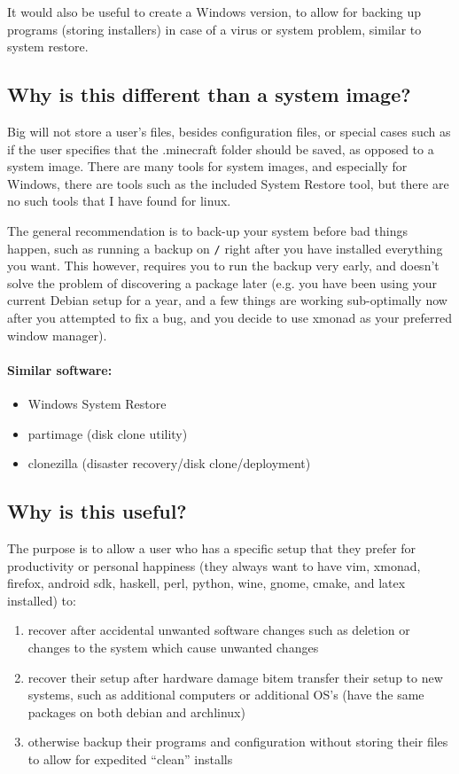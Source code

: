\documentclass[12pt]{article}
\begin{document}
        It would also be useful to create a Windows version, to allow for backing up programs (storing installers) in case of a virus or system problem, similar to system restore.

        \subsection{Why is this different than a system image?}
            Big will not store a user's files, besides configuration files, or special cases such as if the user specifies that the .minecraft folder should be saved, as opposed to a system image.  There are many tools for system images, and especially for Windows, there are tools such as the included System Restore tool, but there are no such tools that I have found for linux.  

            The general recommendation is to back-up your system before bad things happen, such as running a backup on \verb+/+ right after you have installed everything you want.  This however, requires you to run the backup very early, and doesn't solve the problem of discovering a package later (e.g. you have been using your current Debian setup for a year, and a few things are working sub-optimally now after you attempted to fix a bug, and you decide to use xmonad as your preferred window manager).
        
            \paragraph{Similar software:}
                \begin{itemize} 
                    \item Windows System Restore
                    \item partimage (disk clone utility)
                    \item clonezilla (disaster recovery/disk clone/deployment)
                \end{itemize}

        \subsection{Why is this useful?}
            The purpose is to allow a user who has a specific setup that they prefer for productivity or personal happiness (they always want to have vim, xmonad, firefox, android sdk, haskell, perl, python, wine, gnome, cmake, and latex installed) to:
            \begin{enumerate}
                \item recover after accidental unwanted software changes such as deletion or changes to the system which cause unwanted changes
                \item recover their setup after hardware damage
                bitem transfer their setup to new systems, such as additional computers or additional OS's (have the same packages on both debian and archlinux)
                \item otherwise backup their programs and configuration without storing their files to allow for expedited ``clean'' installs
            \end{enumerate}
\end{document}
